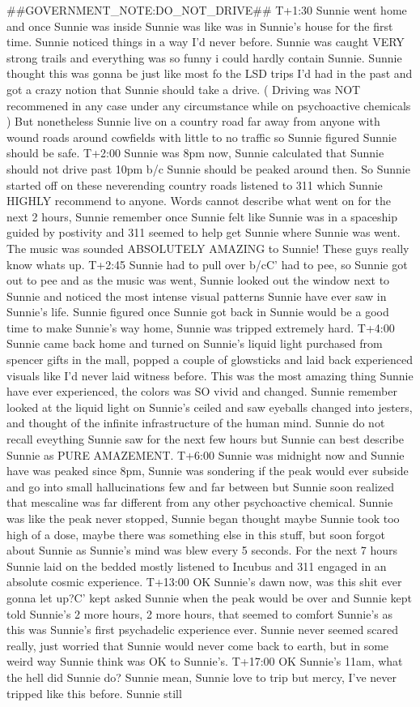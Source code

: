 \documentclass[12pt]{book}
\begin{document}
\#\#GOVERNMENT\_NOTE:DO\_NOT\_DRIVE\#\# T+1:30 Sunnie went home and once Sunnie was inside Sunnie was like was in Sunnie's house for the first time. Sunnie noticed things in a way I'd never before. Sunnie was caught VERY strong trails and everything was so funny i could hardly contain Sunnie. Sunnie thought this was gonna be just like most fo the LSD trips I'd had in the past and got a crazy notion that Sunnie should take a drive. ( Driving was NOT recommened in any case under any circumstance while on psychoactive chemicals ) But nonetheless Sunnie live on a country road far away from anyone with wound roads around cowfields with little to no traffic so Sunnie figured Sunnie should be safe. T+2:00 Sunnie was 8pm now, Sunnie calculated that Sunnie should not drive past 10pm b/c Sunnie should be peaked around then. So Sunnie started off on these neverending country roads listened to 311 which Sunnie HIGHLY recommend to anyone. Words cannot describe what went on for the next 2 hours, Sunnie remember once Sunnie felt like Sunnie was in a spaceship guided by postivity and 311 seemed to help get Sunnie where Sunnie was went. The music was sounded ABSOLUTELY AMAZING to Sunnie! These guys really know whats up. T+2:45 Sunnie had to pull over b/cC' had to pee, so Sunnie got out to pee and as the music was went, Sunnie looked out the window next to Sunnie and noticed the most intense visual patterns Sunnie have ever saw in Sunnie's life. Sunnie figured once Sunnie got back in Sunnie would be a good time to make Sunnie's way home, Sunnie was tripped extremely hard. T+4:00 Sunnie came back home and turned on Sunnie's liquid light purchased from spencer gifts in the mall, popped a couple of glowsticks and laid back experienced visuals like I'd never laid witness before. This was the most amazing thing Sunnie have ever experienced, the colors was SO vivid and changed. Sunnie remember looked at the liquid light on Sunnie's ceiled and saw eyeballs changed into jesters, and thought of the infinite infrastructure of the human mind. Sunnie do not recall eveything Sunnie saw for the next few hours but Sunnie can best describe Sunnie as PURE AMAZEMENT. T+6:00 Sunnie was midnight now and Sunnie have was peaked since 8pm, Sunnie was sondering if the peak would ever subside and go into small hallucinations few and far between but Sunnie soon realized that mescaline was far different from any other psychoactive chemical. Sunnie was like the peak never stopped, Sunnie began thought maybe Sunnie took too high of a dose, maybe there was something else in this stuff, but soon forgot about Sunnie as Sunnie's mind was blew every 5 seconds. For the next 7 hours Sunnie laid on the bedded mostly listened to Incubus and 311 engaged in an absolute cosmic experience. T+13:00 OK Sunnie's dawn now, was this shit ever gonna let up?C' kept asked Sunnie when the peak would be over and Sunnie kept told Sunnie's 2 more hours, 2 more hours, that seemed to comfort Sunnie's as this was Sunnie's first psychadelic experience ever. Sunnie never seemed scared really, just worried that Sunnie would never come back to earth, but in some weird way Sunnie think was OK to Sunnie's. T+17:00 OK Sunnie's 11am, what the hell did Sunnie do? Sunnie mean, Sunnie love to trip but mercy, I've never tripped like this before. Sunnie still 
\end{document}
